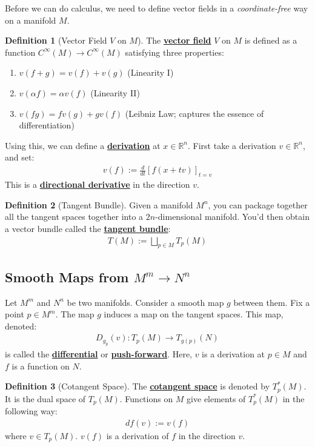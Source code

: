 \documentclass[11pt]{scrartcl}
\newcommand{\R}[0]{\mathbb{R}}
\theoremstyle{definition}
\newtheorem{definition}{Definition}
\theoremstyle{remark}
\newcommand{\dfn}[1]{\textbf{\underline{#1}}}
\begin{document}
{Before we can do calculus, we need to define vector fields in a \emph{coordinate-free} way on a manifold $M$. 

\begin{definition}[Vector Field $V$ on $M$]
	The \dfn{vector field} $V$ on $M$ is defined as a function $C^\infty(M) \rightarrow C^\infty(M)$ satisfying three properties: 
	\begin{enumerate}[noitemsep]
		\item $v(f+g) = v(f) + v(g) $ (Linearity I) 
		\item $v (\alpha f) = \alpha v(f) $ (Linearity II) 
		\item $v(fg) = fv(g) + gv(f)$ (Leibniz Law; captures the essence of differentiation)
	\end{enumerate}
\end{definition}

Using this, we can define a \dfn{derivation} at $x \in \R^n$. First take a derivation $v \in \R^n$, and set: 
\begin{align}
	v(f) := \frac{d}{dt} \left[ f(x+tv) \right]_{t =v} 	
\end{align}
This is a \dfn{directional derivative} in the direction $v$. 

\begin{definition}[Tangent Bundle]
	Given a manifold $M^n$, you can package together all the tangent spaces together into a $2n$-dimensional manifold. You'd then obtain a vector bundle called the \dfn{tangent bundle}: 
	\begin{align*}
		T(M) := \bigsqcup_{p \in M} T_p(M) 
	\end{align*}
\end{definition}

\subsection{Smooth Maps from $M^m \rightarrow N^n$}
Let $M^m$ and $N^n$ be two manifolds. Consider a smooth map $g$ between them. Fix a point $p \in M^m$. The map $g$ induces a map on the tangent spaces. This map, denoted: 
\begin{align*}
	 D_{g_p}(v): T_p(M) \rightarrow T_{g(p)}(N)
\end{align*}
	is called the \dfn{differential} or \dfn{push-forward}. Here, $v$ is a derivation at $p \in M$ and $f$ is a function on $N$. 


\begin{definition}[Cotangent Space]
	The \dfn{cotangent space} is denoted by $T^*_p(M)$. It is the dual space of $T_p(M)$. Functions on $M$ give elements of $T_p^*(M)$ in the following way: 
	\begin{align*}
		df(v) := v(f) 
	\end{align*}
	where $v \in T_p(M)$. $v(f)$ is a derivation of $f$ in the direction $v$. 
\end{definition}
}
\end{document}
